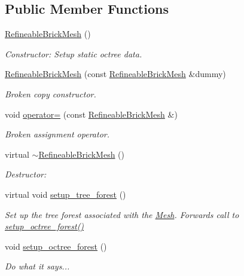 \subsection*{Public Member Functions}
\begin{DoxyCompactItemize}
\item 
\hyperlink{classoomph_1_1RefineableBrickMesh_a8812801e58475d1296b08f7891c9287d}{Refineable\+Brick\+Mesh} ()
\begin{DoxyCompactList}\small\item\em Constructor\+: Setup static octree data. \end{DoxyCompactList}\item 
\hyperlink{classoomph_1_1RefineableBrickMesh_add68645a4655055660c49388d345c421}{Refineable\+Brick\+Mesh} (const \hyperlink{classoomph_1_1RefineableBrickMesh}{Refineable\+Brick\+Mesh} \&dummy)
\begin{DoxyCompactList}\small\item\em Broken copy constructor. \end{DoxyCompactList}\item 
void \hyperlink{classoomph_1_1RefineableBrickMesh_a72505ccf7f32899ea724c9a2ab1883e0}{operator=} (const \hyperlink{classoomph_1_1RefineableBrickMesh}{Refineable\+Brick\+Mesh} \&)
\begin{DoxyCompactList}\small\item\em Broken assignment operator. \end{DoxyCompactList}\item 
virtual \hyperlink{classoomph_1_1RefineableBrickMesh_a179600dd1c82fb9f3753f59d9cc262f6}{$\sim$\+Refineable\+Brick\+Mesh} ()
\begin{DoxyCompactList}\small\item\em Destructor\+: \end{DoxyCompactList}\item 
virtual void \hyperlink{classoomph_1_1RefineableBrickMesh_afdb7af23886c1088ce9dcc855028fb84}{setup\+\_\+tree\+\_\+forest} ()
\begin{DoxyCompactList}\small\item\em Set up the tree forest associated with the \hyperlink{classoomph_1_1Mesh}{Mesh}. Forwards call to \hyperlink{classoomph_1_1RefineableBrickMesh_a7488ae090e09e3f1e01b20a2c2c7a188}{setup\+\_\+octree\+\_\+forest()} \end{DoxyCompactList}\item 
void \hyperlink{classoomph_1_1RefineableBrickMesh_a7488ae090e09e3f1e01b20a2c2c7a188}{setup\+\_\+octree\+\_\+forest} ()
\begin{DoxyCompactList}\small\item\em Do what it says... \end{DoxyCompactList}\end{DoxyCompactItemize}
